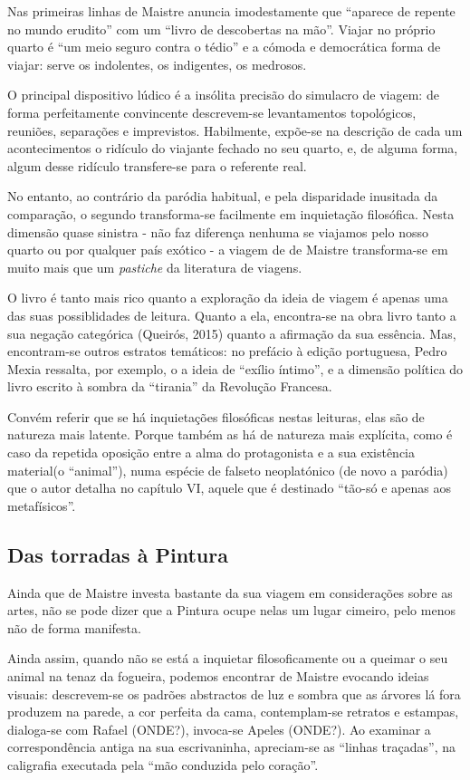 \documentclass[12pt]{article}
\begin{document}
Nas primeiras linhas de Maistre anuncia imodestamente que ``aparece de repente no mundo erudito'' com um ``livro de descobertas na mão''. Viajar no próprio quarto é ``um meio seguro contra o tédio'' e a cómoda e democrática forma de viajar: serve os indolentes, os indigentes, os medrosos.

O principal dispositivo lúdico é a insólita precisão do simulacro de viagem: de forma perfeitamente convincente descrevem-se levantamentos topológicos, reuniões, separações e imprevistos. Habilmente, expõe-se na descrição de cada um acontecimentos o ridículo do viajante fechado no seu quarto, e, de alguma forma, algum desse ridículo transfere-se para o referente real.

No entanto, ao contrário da paródia habitual, e pela disparidade inusitada da comparação, o segundo transforma-se facilmente em inquietação filosófica. Nesta dimensão quase sinistra - não faz diferença nenhuma se viajamos pelo nosso quarto ou por qualquer país exótico - a viagem de de Maistre transforma-se em muito mais que um \emph{pastiche} da literatura de viagens.

O livro é tanto mais rico quanto a exploração da ideia de viagem é apenas uma das suas possiblidades de leitura. Quanto a ela, encontra-se na obra livro tanto a sua negação categórica (Queirós, 2015) quanto a afirmação da sua essência. Mas, encontram-se outros estratos temáticos: no prefácio à edição portuguesa, Pedro Mexia ressalta, por exemplo, o a ideia de ``exílio íntimo'', e a dimensão política do livro escrito à sombra da ``tirania'' da Revolução Francesa.

Convém referir que se há inquietações filosóficas nestas leituras, elas são de natureza mais latente. Porque também as há de natureza mais explícita, como é caso da repetida oposição entre a alma do protagonista e a sua existência material(o ``animal''), numa espécie de falseto neoplatónico (de novo a paródia) que o autor detalha no capítulo VI, aquele que é destinado ``tão-só e apenas aos metafísicos''.

\subsection{Das torradas à Pintura}

Ainda que de Maistre investa bastante da sua viagem em considerações sobre as artes, não se pode dizer que a Pintura ocupe nelas um lugar cimeiro, pelo menos não de forma manifesta.

Ainda assim, quando não se está a inquietar filosoficamente ou a queimar o seu animal na tenaz da fogueira, podemos encontrar de Maistre evocando ideias visuais: descrevem-se os padrões abstractos de luz e sombra que as árvores lá fora produzem na parede, a cor perfeita da cama, contemplam-se retratos e estampas, dialoga-se com Rafael (ONDE?), invoca-se Apeles (ONDE?). Ao examinar a correspondência antiga na sua escrivaninha, apreciam-se as ``linhas traçadas'', na caligrafia executada pela ``mão conduzida pelo coração''.
\end{document}
